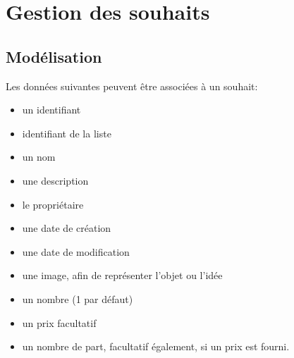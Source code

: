 \documentclass[11pt]{amsbook}
\begin{document}
\hypertarget{x-gestion-des-souhaits}{\section{Gestion des souhaits}}
\hypertarget{x-modélisation}{\subsection{Modélisation}}
Les données suivantes peuvent être associées à un souhait:


\begin{itemize}

\item un identifiant

\item identifiant de la liste

\item un nom

\item une description

\item le propriétaire

\item une date de création

\item une date de modification

\item une image, afin de représenter l’objet ou l’idée

\item un nombre (1 par défaut)

\item un prix facultatif

\item un nombre de part, facultatif également, si un prix est fourni.

\end{itemize}
\end{document}
